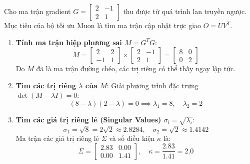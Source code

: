 \begin{conceptbox}
Cho ma trận gradient $G = \begin{bmatrix} 2 & -1 \\ 2 & 1 \end{bmatrix}$ thu được từ quá trình lan truyền ngược. Mục tiêu của bộ tối ưu Muon là tìm ma trận cập nhật trực giao $O = UV^T$.
\begin{enumerate}[label=\textbf{Bước \arabic*:}, leftmargin=*]
    \item \textbf{Tính ma trận hiệp phương sai $M = G^T G$}:
    \[
    M = \begin{bmatrix} 2 & 2 \\ -1 & 1 \end{bmatrix} \times \begin{bmatrix} 2 & -1 \\ 2 & 1 \end{bmatrix} = \begin{bmatrix} 8 & 0 \\ 0 & 2 \end{bmatrix}
    \]
    Do $M$ đã là ma trận đường chéo, các trị riêng có thể thấy ngay lập tức.
    
    \item \textbf{Tìm các trị riêng $\lambda$ của $M$}:
    Giải phương trình đặc trưng $\det(M - \lambda I) = 0$:
    \[
    (8 - \lambda)(2 - \lambda) = 0 \implies \lambda_1 = 8, \quad \lambda_2 = 2
    \]
    
    \item \textbf{Tìm các giá trị riêng lẻ (Singular Values) $\sigma_i = \sqrt{\lambda_i}$}:
    \[
    \sigma_1 = \sqrt{8} = 2\sqrt{2} \approx 2.8284, \quad \sigma_2 = \sqrt{2} \approx 1.4142
    \]
    Ma trận các giá trị riêng lẻ $\Sigma$ và số điều kiện $\kappa$ là:
    \[
    \Sigma = \begin{bmatrix} 2.83 & 0.00 \\ 0.00 & 1.41 \end{bmatrix}, \quad \kappa = \frac{2.83}{1.41} = 2.0
    \]
    

\end{enumerate}
\end{conceptbox}
